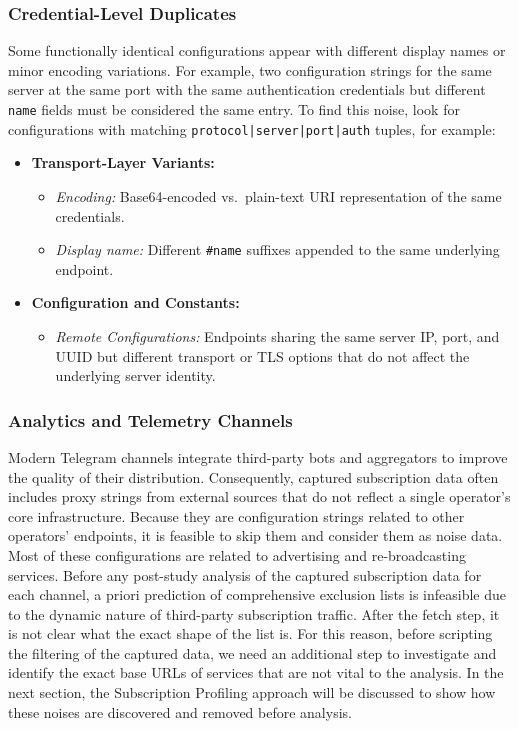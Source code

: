 \documentclass[10pt,conference]{IEEEtran}
\begin{document}
\subsubsection{Credential-Level Duplicates}
Some functionally identical configurations appear with different display names or minor encoding variations.
For example, two configuration strings for the same server at the same port with the same authentication credentials but different \texttt{name} fields must be considered the same entry.
To find this noise, look for configurations with matching \texttt{protocol|server|port|auth} tuples, for example:
\begin{itemize}
    \item \textbf{Transport-Layer Variants:}
    \begin{itemize}
        \item \textit{Encoding:} Base64-encoded vs.\ plain-text URI representation of the same credentials.
        \item \textit{Display name:} Different \texttt{\#name} suffixes appended to the same underlying endpoint.
    \end{itemize}
    \item \textbf{Configuration and Constants:}
    \begin{itemize}
        \item \textit{Remote Configurations:} Endpoints sharing the same server IP, port, and UUID but different transport or TLS options that do not affect the underlying server identity.
    \end{itemize}
\end{itemize}

\subsubsection{Analytics and Telemetry Channels}
Modern Telegram channels integrate third-party bots and aggregators to improve the quality of their distribution.
Consequently, captured subscription data often includes proxy strings from external sources that do not reflect a single operator's core infrastructure.
Because they are configuration strings related to other operators' endpoints, it is feasible to skip them and consider them as noise data.
Most of these configurations are related to advertising and re-broadcasting services.
Before any post-study analysis of the captured subscription data for each channel, a priori prediction of comprehensive exclusion lists is infeasible due to the dynamic nature of third-party subscription traffic.
After the fetch step, it is not clear what the exact shape of the list is.
For this reason, before scripting the filtering of the captured data, we need an additional step to investigate and identify the exact base URLs of services that are not vital to the analysis.
In the next section, the Subscription Profiling approach will be discussed to show how these noises are discovered and removed before analysis.
\end{document}
